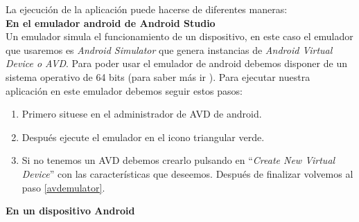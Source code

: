 La ejecución de la aplicación puede hacerse de diferentes maneras:\\
\textbf{En el emulador android de Android Studio}\\
Un emulador simula el funcionamiento de un dispositivo, en este caso el emulador que usaremos es \textit{Android Simulator} que genera instancias de \textit{Android Virtual Device o AVD}. 
Para poder usar el emulador de android debemos disponer de un sistema operativo de 64 bits (para saber más ir \cite{andsim}).
Para ejecutar nuestra aplicación en este emulador debemos seguir estos pasos:
\begin{enumerate}
\item \label{avdemulator}
	Primero situese en el administrador de AVD de android.
\item
	Después ejecute el emulador en el icono triangular verde.
\item
	Si no tenemos un AVD debemos crearlo pulsando en ``\textit{Create New Virtual Device}'' con las características que deseemos. Después de finalizar volvemos al paso \ref{avdemulator}.
\end{enumerate}

\textbf{En un dispositivo Android}\\

